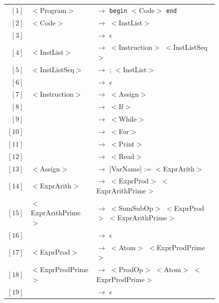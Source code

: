 \documentclass[letterpaper]{article}
\begin{document}
\begin{figure}[H]
    \centering
    \begin{tabular}{r l l}
        $[1]$ & $<$Program$>$ & $\rightarrow$ \texttt{begin} $<$Code$>$
        \texttt{end} \\

        $[2]$ & $<$Code$>$ & $\rightarrow$ $<$InstList$>$ \\
        $[3]$ & & $\rightarrow$ $\epsilon$ \\

        $[4]$ & $<$InstList$>$ & $\rightarrow$ $<$Instruction$>$
        $<$InstListSeq$>$ \\

        $[5]$ & $<$InstListSeq$>$ & $\rightarrow$ ; $<$InstList$>$ \\
        $[6]$ & & $\rightarrow$ $\epsilon$ \\

        $[7]$ & $<$Instruction$>$ & $\rightarrow$ $<$Assign$>$ \\
        $[8]$ &                   & $\rightarrow$ $<$If$>$ \\
        $[9]$ &                   & $\rightarrow$ $<$While$>$ \\
        $[10]$ &                   & $\rightarrow$ $<$For$>$ \\
        $[11]$ &                   & $\rightarrow$ $<$Print$>$ \\
        $[12]$ &                   & $\rightarrow$ $<$Read$>$ \\

        $[13]$ & $<$Assign$>$ & $\rightarrow$
         [VarName] := $<$ExprArith$>$  \\

        $[14]$ & $<$ExprArith$>$ & $\rightarrow$
        $<$ExprProd$>$ $<$ExprArithPrime$>$ \\

        $[15]$ & $<$ExprArithPrime$>$ & $\rightarrow$
        $<$SumSubOp$>$ $<$ExprProd$>$ $<$ExprArithPrime$>$ \\
        $[16]$ & & $\rightarrow$ $\epsilon$ \\

        $[17]$ & $<$ExprProd$>$ & $\rightarrow$
        $<$Atom$>$ $<$ExprProdPrime$>$ \\

        $[18]$ & $<$ExprProdPrime$>$ & $\rightarrow$
        $<$ProdOp$>$ $<$Atom$>$ $<$ExprProdPrime$>$ \\
        $[19]$ & & $\rightarrow$ $\epsilon$ \\


\end{tabular}
\end{figure}
\end{document}
